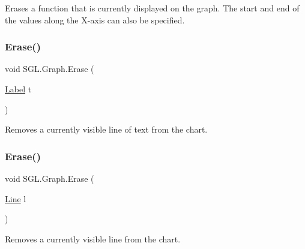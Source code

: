 Erases a function that is currently displayed on the graph. The start and end of the values along the X-\/axis can also be specified. 

\mbox{\label{class_s_g_l_1_1_graph_a794de8a13de541b1b6e43a94469a1801}} 
\subsubsection{\texorpdfstring{Erase()}{Erase()}\hspace{0.1cm}{\footnotesize\ttfamily [2/6]}}
{\footnotesize\ttfamily void S\+G\+L.\+Graph.\+Erase (\begin{DoxyParamCaption}\item[{\mbox{\hyperlink{class_s_g_l_1_1_label}{Label}}}]{t }\end{DoxyParamCaption})\hspace{0.3cm}{\ttfamily [inline]}}



Removes a currently visible line of text from the chart. 

\mbox{\label{class_s_g_l_1_1_graph_ae091fb4ee52a500a4c6d186bc4b5d27f}} 
\subsubsection{\texorpdfstring{Erase()}{Erase()}\hspace{0.1cm}{\footnotesize\ttfamily [3/6]}}
{\footnotesize\ttfamily void S\+G\+L.\+Graph.\+Erase (\begin{DoxyParamCaption}\item[{\mbox{\hyperlink{class_s_g_l_1_1_line}{Line}}}]{l }\end{DoxyParamCaption})\hspace{0.3cm}{\ttfamily [inline]}}



Removes a currently visible line from the chart. 

\mbox{\label{class_s_g_l_1_1_graph_ae0b009d2b01edfb52598f28fc89728da}} 
